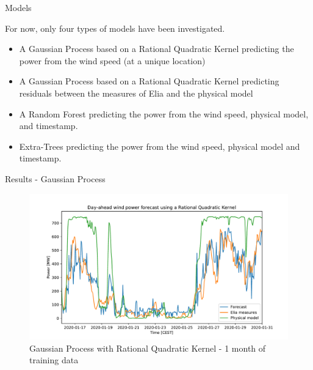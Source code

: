 \documentclass[12pt]{beamer}
\begin{document}
\begin{frame}{Models}

For now, only four types of models have been investigated.
\begin{itemize}
    \item A \alert{Gaussian Process} based on a Rational Quadratic Kernel predicting the power from the wind speed (at a unique location)
    \item A \alert{Gaussian Process} based on a Rational Quadratic Kernel predicting \alert{residuals} between the measures of Elia and the physical model
    \item A \alert{Random Forest} predicting the power from the wind speed, physical model, and timestamp.
    \item \alert{Extra-Trees} predicting the power from the wind speed, physical model and timestamp.
\end{itemize}

\end{frame}

\begin{frame}{Results - Gaussian Process}
    \begin{figure}
        \centering
        \includegraphics[width=\textwidth]{resources/pdf/dawpf_rqk_1b.pdf}
        \caption{Gaussian Process with Rational Quadratic Kernel - 1 month of training data}
    \end{figure}
\end{frame}
\end{document}
